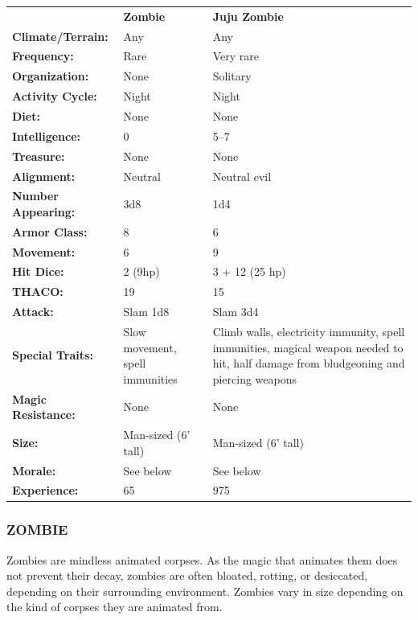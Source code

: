 \begin{multicols}{2}
\begin{minipage}{\columnwidth}
\noindent \begin{tabular}{p{}g{.24\columnwidth}p{.24\columnwidth}}
	& \textbf{Zombie}	& \textbf{Juju Zombie}	\\
\textbf{Climate/Terrain:}	& Any	& Any	\\
\textbf{Frequency:} 		& Rare	& Very rare	\\
\textbf{Organization:} 		& None	& Solitary	\\
\textbf{Activity Cycle:} 	& Night	& Night	\\
\textbf{Diet:} 				& None	& None	\\
\textbf{Intelligence:} 		& 0	& 5--7	\\
\textbf{Treasure:} 			& None	& None	\\
\textbf{Alignment:} 		& Neutral	& Neutral evil	\\
\hline
\textbf{Number Appearing:} 	& 3d8	& 1d4	\\
\textbf{Armor Class:} 		& 8	& 6	\\
\textbf{Movement:} 			& 6	& 9	\\
\textbf{Hit Dice:} 			& 2 (9hp)	& 3 + 12 (25 hp)	\\
\textbf{THACO:} 			& 19	& 15	\\
\textbf{Attack:} 			& Slam 1d8	& Slam 3d4	\\
\textbf{Special Traits:} & Slow movement, spell immunities	& Climb walls, electricity immunity, spell immunities, magical weapon needed to hit, half damage from bludgeoning and piercing weapons	\\
\textbf{Magic Resistance:} 	& None	& None	\\
\textbf{Size:} 				& Man-sized (6' tall)	& Man-sized (6' tall)	\\
\textbf{Morale:} 			& See below	& See below	\\
\textbf{Experience:} 		& 65	& 975	\\
\end{tabular}

\end{minipage}

\subsubsection{ZOMBIE}

Zombies are mindless animated corpses. As the magic that animates them does not prevent their decay, zombies are often bloated, rotting, or desiccated, depending on their surrounding environment. Zombies vary in size depending on the kind of corpses they are animated from.


\end{multicols}
